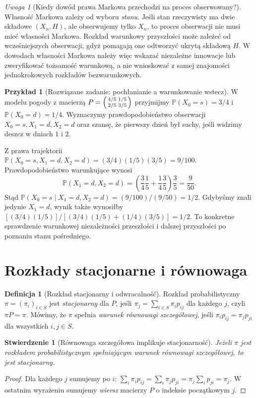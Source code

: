 \documentclass[11pt,a4paper,oneside]{report}
\numberwithin{equation}{chapter}
\theoremstyle{plain}
\newtheorem{stwierdzenie}[twierdzenie]{Stwierdzenie}
\theoremstyle{definition}
\newtheorem{definicja}{Definicja}[chapter]
\newtheorem{przyklad}{Przykład}[chapter]
\theoremstyle{remark}
\newtheorem{uwaga}{Uwaga}[chapter]
\newcommand{\Prob}{\mathbb{P}}
\begin{document}
\begin{uwaga}[Kiedy dowód prawa Markowa przechodzi na proces obserwowany?]
Własność Markowa zależy od wyboru \emph{stanu}.
Jeśli stan rzeczywisty ma dwie składowe $(X_n,H)$,
ale obserwujemy tylko $X_n$, to proces obserwacji
nie musi mieć własności Markowa. Rozkład warunkowy
przyszłości może zależeć od wcześniejszych obserwacji,
gdyż pomagają one odtworzyć ukrytą składową $H$.
W dowodach własności Markowa należy więc wskazać
niezależne innowacje lub zweryfikować tożsamość
warunkową, a nie wnioskować z samej znajomości
jednokrokowych rozkładów bezwarunkowych.
\end{uwaga}

\begin{przyklad}[Rozwiązane zadanie: pochłanianie a warunkowanie wstecz]
W modelu pogody z macierzą
$P=\begin{psmallmatrix}4/5&1/5\\2/5&3/5\end{psmallmatrix}$
przyjmijmy $\Prob(X_0=s)=3/4$ i
$\Prob(X_0=d)=1/4$. Wyznaczymy prawdopodobieństwo
obserwacji $X_0=s,X_1=d,X_2=d$ oraz szansę,
że pierwszy dzień był suchy, jeśli widzimy
deszcz w dniach $1$ i $2$.

Z prawa trajektorii
$\Prob(X_0=s,X_1=d,X_2=d)
=(3/4)(1/5)(3/5)=9/100$.
Prawdopodobieństwo warunkujące wynosi
\[
\Prob(X_1=d,X_2=d)
=\left(\frac34\frac15+\frac14\frac35\right)\frac35
=\frac9{50}.
\]
Stąd
$\Prob(X_0=s\mid X_1=d,X_2=d)
=(9/100)/(9/50)=1/2$.
Gdybyśmy znali jedynie $X_1=d$, wynik także
wynosiłby
$[(3/4)(1/5)]/[(3/4)(1/5)+(1/4)(3/5)]=1/2$.
To konkretne sprawdzenie warunkowej niezależności
przeszłości i dalszej przyszłości po poznaniu
stanu pośredniego.
\end{przyklad}

\section{Rozkłady stacjonarne i równowaga}

\begin{definicja}[Rozkład stacjonarny i odwracalność]
Rozkład probabilistyczny $\pi=(\pi_i)_{i\in S}$
jest \emph{stacjonarny} dla $P$, jeśli
$\pi_j=\sum_{i\in S}\pi_i p_{ij}$ dla każdego $j$,
czyli $\pi P=\pi$.
Mówimy, że $\pi$ spełnia \emph{warunek równowagi
szczegółowej}, jeśli
$\pi_i p_{ij}=\pi_jp_{ji}$ dla wszystkich $i,j\in S$.
\end{definicja}

\begin{stwierdzenie}[Równowaga szczegółowa implikuje stacjonarność]
Jeżeli $\pi$ jest rozkładem probabilistycznym
spełniającym warunek równowagi szczegółowej,
to jest stacjonarny.
\end{stwierdzenie}
\begin{proof}
Dla każdego $j$ sumujemy po $i$:
$\sum_i\pi_i p_{ij}=\sum_i\pi_jp_{ji}
=\pi_j\sum_i p_{ji}=\pi_j$.
W ostatnim wyrażeniu sumujemy \emph{wiersz}
macierzy $P$ o indeksie początkowym $j$.
\end{proof}
\end{document}
